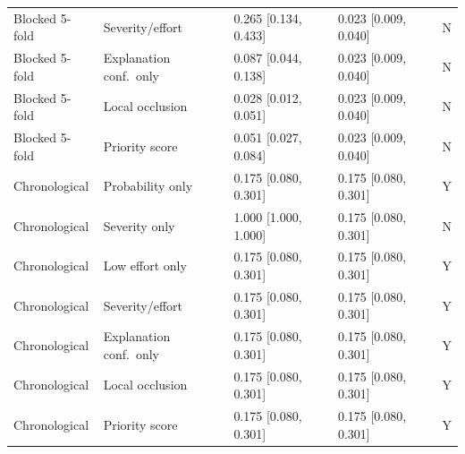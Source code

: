 \begin{table}[t]
\begin{tabular}{p{1.35cm}p{1.85cm}p{1.75cm}p{1.75cm}p{0.5cm}}
Blocked 5-fold & Severity/effort & 0.265 [0.134, 0.433] & 0.023 [0.009, 0.040] & N \\
Blocked 5-fold & Explanation conf.\ only & 0.087 [0.044, 0.138] & 0.023 [0.009, 0.040] & N \\
Blocked 5-fold & Local occlusion & 0.028 [0.012, 0.051] & 0.023 [0.009, 0.040] & N \\
Blocked 5-fold & Priority score & 0.051 [0.027, 0.084] & 0.023 [0.009, 0.040] & N \\
\hline
Chronological & Probability only & 0.175 [0.080, 0.301] & 0.175 [0.080, 0.301] & Y \\
Chronological & Severity only & 1.000 [1.000, 1.000] & 0.175 [0.080, 0.301] & N \\
Chronological & Low effort only & 0.175 [0.080, 0.301] & 0.175 [0.080, 0.301] & Y \\
Chronological & Severity/effort & 0.175 [0.080, 0.301] & 0.175 [0.080, 0.301] & Y \\
Chronological & Explanation conf.\ only & 0.175 [0.080, 0.301] & 0.175 [0.080, 0.301] & Y \\
Chronological & Local occlusion & 0.175 [0.080, 0.301] & 0.175 [0.080, 0.301] & Y \\
Chronological & Priority score & 0.175 [0.080, 0.301] & 0.175 [0.080, 0.301] & Y \\
\hline
\end{tabular}
\end{table}
